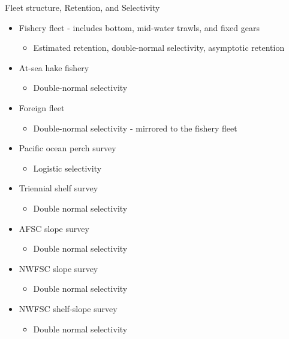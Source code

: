 \documentclass[pdf]{beamer}\usepackage[]{graphicx}\usepackage[]{color}
\begin{document}
\begin{frame}{Fleet structure, Retention, and Selectivity}
  \begin{itemize}
    \item Fishery fleet - includes bottom, mid-water trawls, and fixed gears
      \begin{itemize}
        \item Estimated retention, double-normal selectivity, asymptotic retention
      \end{itemize}
    \item At-sea hake fishery
      \begin{itemize}
        \item Double-normal selectivity
      \end{itemize}
    \item Foreign fleet
      \begin{itemize}
        \item Double-normal selectivity - mirrored to the fishery fleet
      \end{itemize}
    \item Pacific ocean perch survey
      \begin{itemize}
        \item Logistic selectivity 
      \end{itemize}
    \item Triennial shelf survey
      \begin{itemize}
        \item Double normal selectivity 
      \end{itemize}
    \item AFSC slope survey
        \begin{itemize}
        \item Double normal selectivity 
      \end{itemize}
    \item NWFSC slope survey
      \begin{itemize}
        \item Double normal selectivity 
      \end{itemize}
    \item NWFSC shelf-slope survey
      \begin{itemize}
        \item Double normal selectivity 
      \end{itemize}
  \end{itemize}
\end{frame}
\end{document}
